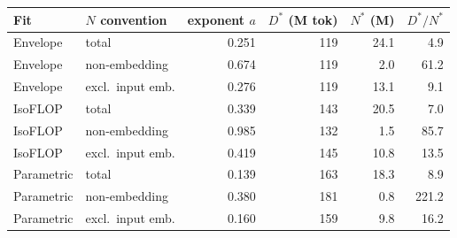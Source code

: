 \begin{tabular}{llrrrr}
\toprule
Fit & $N$ convention & exponent $a$ & $D^*$ (M tok) & $N^*$ (M) & $D^*/N^*$ \\
\midrule
Envelope & total & 0.251 & 119 & 24.1 & 4.9 \\
Envelope & non-embedding & 0.674 & 119 & 2.0 & 61.2 \\
Envelope & excl.\ input emb. & 0.276 & 119 & 13.1 & 9.1 \\
IsoFLOP & total & 0.339 & 143 & 20.5 & 7.0 \\
IsoFLOP & non-embedding & 0.985 & 132 & 1.5 & 85.7 \\
IsoFLOP & excl.\ input emb. & 0.419 & 145 & 10.8 & 13.5 \\
Parametric & total & 0.139 & 163 & 18.3 & 8.9 \\
Parametric & non-embedding & 0.380 & 181 & 0.8 & 221.2 \\
Parametric & excl.\ input emb. & 0.160 & 159 & 9.8 & 16.2 \\
\bottomrule
\end{tabular}
